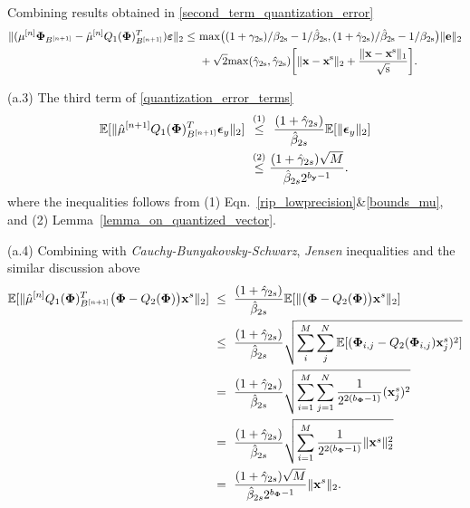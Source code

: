 \documentclass[11pt]{article}
\begin{document}
Combining results obtained in \ref{second_term_quantization_error} 
\begin{equation}\label{second_term_main_theorem}
\begin{split}
    \|(\mu^{[n]}{\bf \Phi}_{B^{[n+1]}} - \hat{\mu}^{[n]}Q_1({\bf \Phi})_{B^{[n+1]}}^T)\boldsymbol{\bf \varepsilon} \|_2 \leq & \ \rm{max}\big((1+\gamma_{2s})/\beta_{2s} - 1/\hat{\beta}_{2s}, (1+\hat{\gamma}_{2s})/\hat{\beta}_{2s} - 1/{\beta}_{2s} \big)\|{\bf e} \|_2\\
    & \ + \sqrt{2}\rm{max}(\hat{\gamma}_{2s}, \hat{\gamma}_{2s})\bigg  [ \|{\bf x}-{\bf x}^s \|_2 + \frac{\|{\bf x}-{\bf x}^s \|_1}{\sqrt{s}}\bigg].
\end{split}
\end{equation}

(a.3) The third term of \ref{quantization_error_terms}
\begin{equation}\label{third_term_main_theorem}
    \begin{split}
         \mathbb{E}[\|\hat{\mu}^{[n+1]}Q_1({\bf \Phi})_{B^{[n+1]}}^T \boldsymbol{\epsilon}_y \|_2]& \ \stackrel{(1)}{\leq} \  \frac{(1+\hat{\gamma}_{2s})}{\hat{\beta}_{2s}}\mathbb{E}[{\|\boldsymbol{\epsilon}_y \|_2}]\\
         &\ \stackrel{(2)}{\leq}\frac{(1+\hat{\gamma}_{2s})\sqrt{M}}{\hat{\beta}_{2s}2^{b_{\bf y}-1}}.
    \end{split}
\end{equation}
where the inequalities follows from (1) Eqn.~\ref{rip_lowprecision}\&\ref{bounds_mu}, and (2) Lemma~\ref{lemma_on_quantized_vector}.

(a.4) Combining with {\it Cauchy-Bunyakovsky-Schwarz}, {\it Jensen} inequalities and the similar discussion above
\begin{equation}\label{forth_term_main_theorem}
\begin{split}
    \mathbb{E}[\| \hat{\mu}^{[n]}Q_1({\bf \Phi})_{B^{[n+1]}}^T\big({\bf {\bf \Phi}}-Q_2({\bf {\bf \Phi}})\big){\bf x}^s \|_2]&\ \leq \ \frac{(1+\hat{\gamma}_{2s})}{\hat{\beta}_{2s}}\mathbb{E}[\|\big({\bf {\bf \Phi}}-Q_2({\bf {\bf \Phi}})\big){\bf x}^s \|_2]\\
    &\ \leq \ \frac{(1+\hat{\gamma}_{2s})}{\hat{\beta}_{2s}}\sqrt{
    \sum_{i}^M \sum_{j}^N\mathbb{E}[({\bf \Phi}_{i, j}-Q_2({\bf \Phi}_{i, j}){\bf x}_j^s)^2]}\\
    & \ = \ \frac{(1+\hat{\gamma}_{2s})}{\hat{\beta}_{2s}}\sqrt{\sum_{i=1}^M \sum_{j=1}^N \frac{1}{2^{2(b_{\bf \Phi}-1)}}({\bf x}_j^s)^2}\\
    & \ = \ \frac{(1+\hat{\gamma}_{2s})}{\hat{\beta}_{2s}}\sqrt{\sum_{i=1}^M \frac{1}{2^{2(b_{\bf \Phi}-1)}}\|{\bf x}^s\|_2^2}\\
    & \ = \ \frac{(1+\hat{\gamma}_{2s})\sqrt{M}}{\hat{\beta}_{2s}2^{b_{\bf \Phi}-1}}\|{\bf x}^s \|_2.
\end{split}
\end{equation}
\end{document}
